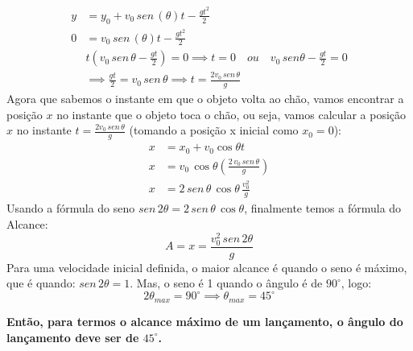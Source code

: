 \documentclass[12pt]{extarticle}
\newcommand{\<}{\langle}
\renewcommand{\>}{\rangle}
\theoremstyle{definition}
\begin{document}
\begin{align*}
    y &= y_0 + v_0\,sen\,(\theta) t -\frac{gt^2}{2}\\
    0&= v_0\,sen\,(\theta) t -\frac{gt^2}{2}\\
    &t(v_0\,sen\,\theta - \frac{gt}{2}) =0 \implies t=0 \quad ou \quad v_0\,sen\theta - \frac{gt}{2} =0\\
    &\implies \frac{gt}{2} = v_0 \,sen\,\theta \implies \boxed{t = \frac{2v_0\,sen\,\theta}{g}}
\end{align*}
Agora que sabemos o instante em que o objeto volta ao chão, vamos encontrar a posição $x$ no instante que o objeto toca o chão, ou seja, vamos calcular a posição $x$ no instante $t = \frac{2v_0\,sen\,\theta}{g}$ (tomando a posição x inicial como $x_0=0$):
\begin{align*}
    x &= x_0 + v_0\cos\theta t\\
    x &= v_0\,\cos\theta \left(\frac{2\,v_0\,sen\,\theta}{g}\right)\\
    x &= 2\,sen\,\theta\,\cos\theta\,\frac{v_0^2}{g}
\end{align*}
Usando a fórmula do seno $sen\,2\theta = 2\,sen\,\theta\,\cos\theta$, finalmente temos a fórmula do Alcance:
\begin{equation}
    \boxed{A = x = \frac{v_0^2\,sen\,2\theta}{g}}
\end{equation}
Para uma velocidade inicial definida, o maior alcance é quando o seno é máximo, que é quando: $sen\,2\theta = 1$. Mas, o seno é 1 quando o ângulo é de $90^\circ$, logo:
\begin{equation}
    \boxed{2\theta_{max} = 90^\circ \implies \theta_{max} = 45^\circ}
\end{equation}

\textbf{Então, para termos o alcance máximo de um lançamento, o ângulo do lançamento deve ser de $45^\circ$.}
\end{document}
